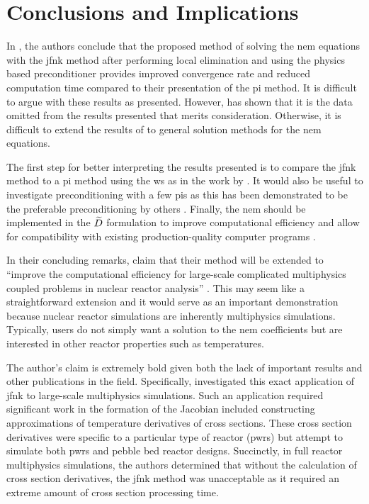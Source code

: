 \section{Conclusions and Implications}
\label{sec:conclusion}

  In , the authors conclude that the proposed method of
  solving the \gls{nem} equations with the \gls{jfnk} method after performing 
  local elimination and using the physics based preconditioner provides improved
  convergence rate and reduced computation time compared to their presentation
  of the \gls{pi} method. It is difficult to argue with these results as
  presented. However,  has shown that it is the data omitted
  from the results presented that merits consideration. Otherwise, it is
  difficult to extend the results of \citeauthor{qe2paper} to general solution
  methods for the \gls{nem} equations.

  The first step for better interpreting the results presented is to compare the
  \gls{jfnk} method to a \gls{pi} method using the \gls{ws} as in the work by
  \citeauthor{jfnk_wielandt}. It would also be useful to investigate
  preconditioning with a few \glspl{pi} as this has been demonstrated to be the
  preferable preconditioning by others \cite{gill_azmy,jfnk_wielandt}. Finally,
  the \gls{nem} should be implemented in the $\widetilde{D}$ formulation to improve
  computational efficiency and allow for compatibility with existing
  production-quality computer programs \cite{palmtagThesis,smith_nonlinear}.

  In their concluding remarks, \citeauthor{qe2paper} claim that their method
  will be extended to ``improve the computational efficiency for large-scale
  complicated multiphysics coupled problems in nuclear reactor analysis''
  \cite{qe2paper}. This may seem like a straightforward extension and it would
  serve as an important demonstration because nuclear reactor simulations are
  inherently multiphysics simulations. Typically, users do not simply want a
  solution to the \gls{nem} coefficients but are interested in other reactor
  properties such as temperatures. 

  The author's claim is extremely bold given both the lack of important results
  and other publications in the field.  Specifically, \citeauthor{caslJFNK}
  investigated this exact application of \gls{jfnk} to large-scale multiphysics
  simulations. Such an application required significant work in the formation of
  the Jacobian included constructing approximations of temperature derivatives
  of cross sections. These cross section derivatives were specific to a
  particular type of reactor (\glspl{pwr}) but \citeauthor{qe2paper} attempt to
  simulate both \glspl{pwr} and pebble bed reactor designs. Succinctly, in
  full reactor multiphysics simulations, the authors determined that without the
  calculation of cross section derivatives, the \gls{jfnk} method was
  unacceptable as it required an extreme amount of cross section processing
  time.

